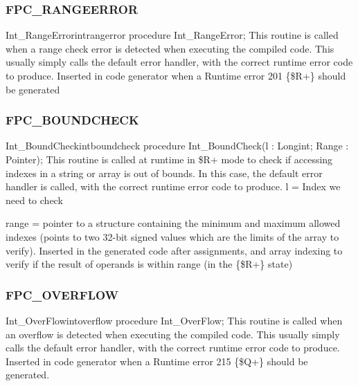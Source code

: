 \documentclass [a4paper,12pt]{article}
\begin{document}
\subsubsection{FPC{\_}RANGEERROR}
\label{subsubsec:mylabel52}

\begin{procedurel}{Int{\_}RangeError}{intrangerror}
\Declaration
procedure Int{\_}RangeError;
\Description
This routine is called when a range check error is detected when executing
the compiled code. This usually simply calls the default error handler, with
the correct runtime error code to produce.
\Parameters
Inserted in code generator when a Runtime error 201 {\{}{\$}R+{\}} should be
generated
\end{procedurel}

\subsubsection{FPC{\_}BOUNDCHECK}
\label{subsubsec:mylabel53}

\begin{procedurel}{Int{\_}BoundCheck}{intboundcheck}
\Declaration
procedure Int{\_}BoundCheck(l : Longint; Range : Pointer);
\Description
This routine is called at runtime in {\$}R+ mode to check if accessing
indexes in a string or array is out of bounds. In this case, the default
error handler is called, with the correct runtime error code to produce.
\Parameters
l = Index we need to check  \par
range = pointer to a structure containing the minimum and maximum allowed
indexes (points to two 32-bit signed values which are the limits of the
array to verify).
\Notes
Inserted in the generated code after assignments, and array indexing to
verify if the result of operands is within range (in the {\{}{\$}R+{\}}
state)
\end{procedurel}

\subsubsection{FPC{\_}OVERFLOW}
\label{subsubsec:mylabel54}

\begin{procedurel}{Int{\_}OverFlow}{intoverflow}
\Declaration
procedure Int{\_}OverFlow;
\Description
This routine is called when an overflow is detected when executing the
compiled code. This usually simply calls the default error handler, with the
correct runtime error code to produce.
\Parameters
Inserted in code generator when a Runtime error 215 {\{}{\$}Q+{\}} should be
generated.
\end{procedurel}
\end{document}
